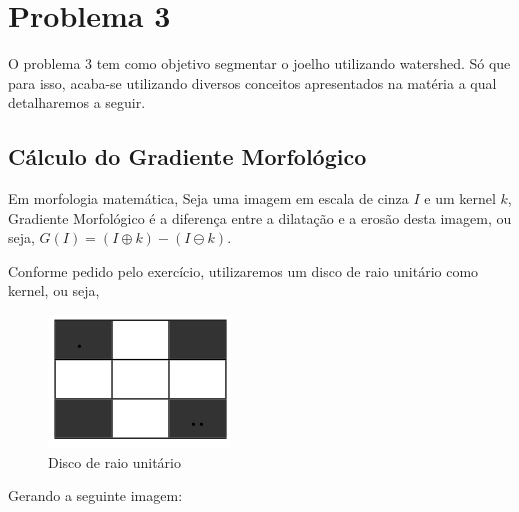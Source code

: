 \documentclass{article}
\begin{document}
	
	\section{Problema 3}	
	
	O problema 3 tem como objetivo segmentar o joelho utilizando watershed. Só que para isso, acaba-se utilizando diversos conceitos apresentados na matéria a qual detalharemos a seguir.
	
	\subsection{Cálculo do Gradiente Morfológico}	
	
	Em morfologia matemática, Seja uma imagem em escala de cinza $I$ e um kernel $k$, Gradiente Morfológico é a diferença entre a dilatação e a erosão desta imagem, ou seja, $G(I) = (I \oplus k) - (I \ominus k)$.
	
	Conforme pedido pelo exercício, utilizaremos um disco de raio unitário como kernel, ou seja, 
	
	\begin{figure}[H]
		\centering
		\includegraphics[scale=0.4]{images/3_disco.png}
		\caption{Disco de raio unitário} 
		
	\end{figure}
	
	Gerando a seguinte imagem:
	
\end{document}
